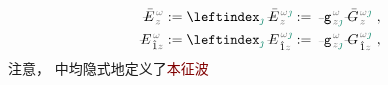 \begin{subequations} \label{eq:amp_eigenmode}
	\begin{align}
		\Xint{\mathcolor{gray}{-}}{30}{\bar{E}}^{\;\!\mathcolor{gray}{\omega}}_{\;\! \mathcolor{gray}{z}} &:= \leftindex_{\textcolor{PineGreen}{\jmath}} \;\! \Xint{\mathcolor{gray}{-}}{30}{\bar{E}}^{\;\!\mathcolor{gray}{\omega} \textcolor{PineGreen}{\jmath}}_{\;\! \mathcolor{gray}{z}} := \Xint{\begin{smallmatrix} ~ \\ {}^{}_{\mathcolor{gray}{-}} \\ ~ \end{smallmatrix}}{09}{\mathtt{g}}^{\;\!\mathcolor{gray}{\omega}}_{\;\! \mathcolor{gray}{z} \textcolor{PineGreen}{\jmath}} \Xint{\mathcolor{gray}{-}}{20}{\bar{G}}^{\;\!\mathcolor{gray}{\omega} \textcolor{PineGreen}{\jmath}}_{\;\! \mathcolor{gray}{z}} ~, \label{eq:vec-amp_eigenmode} \\
		\Xint{\mathcolor{gray}{-}}{30}{E}^{\;\!\mathcolor{gray}{\omega}}_{\;\! \hat{1} \mathcolor{gray}{z}} &:= \leftindex_{\textcolor{PineGreen}{\jmath}} \;\! \Xint{\mathcolor{gray}{-}}{30}{E}^{\;\!\mathcolor{gray}{\omega} \textcolor{PineGreen}{\jmath}}_{\;\! \hat{1} \mathcolor{gray}{z}} := \Xint{\begin{smallmatrix} ~ \\ {}^{}_{\mathcolor{gray}{-}} \\ ~ \end{smallmatrix}}{09}{\mathtt{g}}^{\;\!\mathcolor{gray}{\omega}}_{\;\! \mathcolor{gray}{z} \textcolor{PineGreen}{\jmath}} \Xint{\mathcolor{gray}{-}}{20}{G}^{\;\!\mathcolor{gray}{\omega} \textcolor{PineGreen}{\jmath}}_{\;\! \hat{1} \mathcolor{gray}{z}} ~, \label{eq:components-amp_eigenmode}
	\end{align}
\end{subequations}
注意， 中均隐式地定义了\textcolor{Maroon}{本征波}
